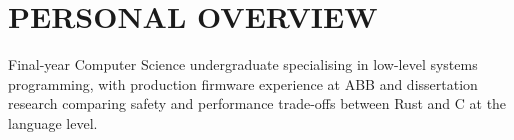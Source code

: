 \section{PERSONAL OVERVIEW}
Final-year Computer Science undergraduate specialising in low-level systems programming, with production firmware experience at ABB and dissertation research comparing safety and performance trade-offs between Rust and C at the language level.